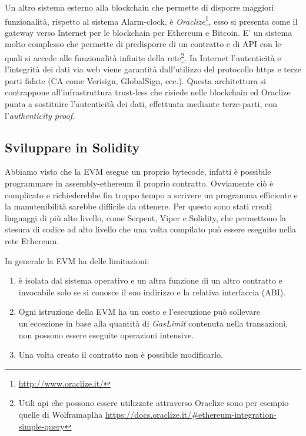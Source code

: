 Un altro sistema esterno alla blockchain che permette di disporre maggiori funzionalità, rispetto al sistema Alarm-clock, è \textit{Oraclize}\footnote{\url{http://www.oraclize.it/}}, esso si presenta come il gateway verso Internet per le blockchain per Ethereum e Bitcoin. E' un sistema molto complesso che permette di predisporre di un contratto e di API con le quali si accede alle funzionalità infinite della rete\footnote{ Utili api che possono essere utilizzate attraverso Oraclize sono per esempio quelle di Wolframaplha  \url{https://docs.oraclize.it/\#ethereum-integration-simple-query}}. In Internet l'autenticità e l'integrità dei dati via web viene garantità dall'utilizzo del protocollo https e terze parti fidate (CA come Verisign, GlobalSign, ecc.). Questa architettura si contrappone all'infrastruttura trust-less che risiede nelle blockchain ed Oraclize punta a sostituire l'autenticità dei dati, effettuata mediante terze-parti, con l'\textit{authenticity proof}.


	\subsection{Sviluppare in Solidity}\label{sssec:sviluppareinsolidity}
	Abbiamo visto che la EVM esegue un proprio bytecode, infatti è possibile programmare in assembly-ethereum il proprio contratto. Ovviamente ciò è complicato e richiederebbe fin troppo tempo a scrivere un programma efficiente e la manutenibilità sarebbe difficile da ottenere.
	Per questo sono stati creati linguaggi di più alto livello, come Serpent, Viper e Solidity, che permettono la stesura di codice ad alto livello che una volta compilato può essere eseguito nella rete Ethereum.
	
	In generale la EVM ha delle limitazioni:
		\begin{enumerate}
			\item è isolata dal sistema operativo e un altra funzione di un altro contratto e invocabile solo se si conosce il suo indirizzo e la relativa interfaccia (ABI).
			\item Ogni istruzione della EVM ha un costo e l'esecuzione può sollevare un'eccezione in base alla quantità di \textit{GasLimit} contenuta nella transazioni, non possono essere eseguite operazioni intensive.
			\item Una volta creato il contratto non è possibile modificarlo. 
		\end{enumerate}
			
